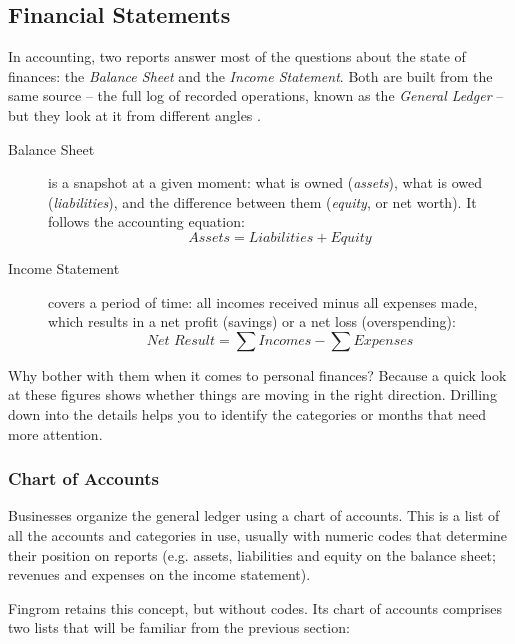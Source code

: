 
\subsection{Financial Statements}

In accounting, two reports answer most of the questions about the state of finances: the \emph{Balance Sheet} and the \emph{Income Statement}. Both are built from the same source -- the full log of recorded operations, known as the \emph{General Ledger} -- but they look at it from different angles \cite{Hart22}.

\begin{description}
  \item[Balance Sheet] is a snapshot at a given moment: what is owned (\emph{assets}), what is owed (\emph{liabilities}), and the difference between them (\emph{equity}, or net worth). It follows the accounting equation:
  \[
    \textit{Assets} = \textit{Liabilities} + \textit{Equity}
  \]
  \item[Income Statement] covers a period of time: all incomes received minus all expenses made, which results in a net profit (savings) or a net loss (overspending):
  \[
    \textit{Net Result} = \sum \textit{Incomes} - \sum \textit{Expenses}
  \]
\end{description}

\noindent Why bother with them when it comes to personal finances? Because a quick look at
these figures shows whether things are moving in the right direction. Drilling down into the
details helps you to identify the categories or months that need more attention.

\subsubsection{Chart of Accounts}

Businesses organize the general ledger using a chart of accounts. This is a list of all the
accounts and categories in use, usually with numeric codes that determine their position on
reports (e.g. assets, liabilities and equity on the balance sheet; revenues and expenses on
the income statement).

Fingrom retains this concept, but without codes. Its chart of accounts comprises two lists
that will be familiar from the previous section:

